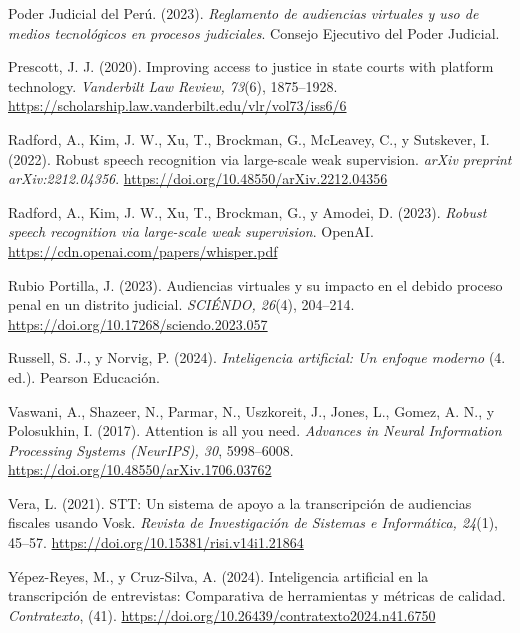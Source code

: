 \documentclass[12pt,a4paper,oneside]{report}
\begin{document}
\vspace{6pt}
Poder Judicial del Perú. (2023). \textit{Reglamento de audiencias virtuales y uso de medios tecnológicos en procesos judiciales}. Consejo Ejecutivo del Poder Judicial.

\vspace{6pt}
Prescott, J. J. (2020). Improving access to justice in state courts with platform technology. \textit{Vanderbilt Law Review, 73}(6), 1875--1928. \url{https://scholarship.law.vanderbilt.edu/vlr/vol73/iss6/6}

\vspace{6pt}
Radford, A., Kim, J. W., Xu, T., Brockman, G., McLeavey, C., y Sutskever, I. (2022). Robust speech recognition via large-scale weak supervision. \textit{arXiv preprint arXiv:2212.04356}. \url{https://doi.org/10.48550/arXiv.2212.04356}

\vspace{6pt}
Radford, A., Kim, J. W., Xu, T., Brockman, G., y Amodei, D. (2023). \textit{Robust speech recognition via large-scale weak supervision}. OpenAI. \url{https://cdn.openai.com/papers/whisper.pdf}

\vspace{6pt}
Rubio Portilla, J. (2023). Audiencias virtuales y su impacto en el debido proceso penal en un distrito judicial. \textit{SCIÉNDO, 26}(4), 204--214. \url{https://doi.org/10.17268/sciendo.2023.057}

\vspace{6pt}
Russell, S. J., y Norvig, P. (2024). \textit{Inteligencia artificial: Un enfoque moderno} (4.\textordfeminine{} ed.). Pearson Educación.


\vspace{6pt}
Vaswani, A., Shazeer, N., Parmar, N., Uszkoreit, J., Jones, L., Gomez, A. N., y Polosukhin, I. (2017). Attention is all you need. \textit{Advances in Neural Information Processing Systems (NeurIPS), 30}, 5998--6008. \url{https://doi.org/10.48550/arXiv.1706.03762}

\vspace{6pt}
Vera, L. (2021). STT: Un sistema de apoyo a la transcripción de audiencias fiscales usando Vosk. \textit{Revista de Investigación de Sistemas e Informática, 24}(1), 45--57. \url{https://doi.org/10.15381/risi.v14i1.21864}

\vspace{6pt}
Yépez-Reyes, M., y Cruz-Silva, A. (2024). Inteligencia artificial en la transcripción de entrevistas: Comparativa de herramientas y métricas de calidad. \textit{Contratexto}, (41). \url{https://doi.org/10.26439/contratexto2024.n41.6750}
\end{document}
